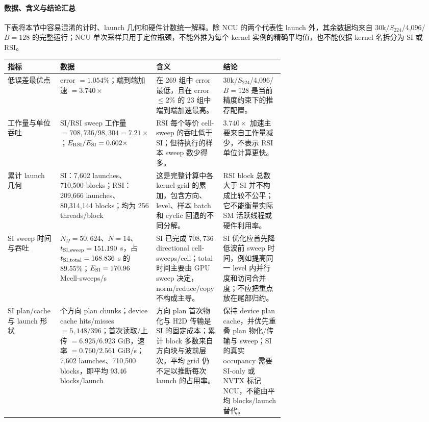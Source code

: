 \documentclass[10pt]{article}
\begin{document}
\paragraph{数据、含义与结论汇总}

下表将本节中容易混淆的计时、launch 几何和硬件计数统一解释。除 NCU 的两个代表性 launch 外，其余数据均来自 30k/$S_{224}$/4,096/$B=128$ 的完整运行；NCU 单次采样只用于定位瓶颈，不能外推为每个 kernel 实例的精确平均值，也不能仅据 kernel 名拆分为 SI 或 RSI。

{\scriptsize\renewcommand{\arraystretch}{1.10}\setlength{\tabcolsep}{3pt}
\begin{tabularx}{\linewidth}{>{\raggedright\arraybackslash}p{0.19\linewidth}>{\raggedright\arraybackslash}p{0.22\linewidth}>{\raggedright\arraybackslash}X>{\raggedright\arraybackslash}p{0.22\linewidth}}
\toprule
指标 & 数据 & 含义 & 结论\\
\midrule
低误差最优点 & error $=1.054\%$；端到端加速 $=3.740\times$ & 在 269 组中 error 最低，且在 error $\leq2\%$ 的 23 组中端到端加速最高。 & 30k/$S_{224}$/4,096/$B=128$ 是当前精度约束下的推荐配置。\\
工作量与单位吞吐 & SI/RSI sweep 工作量 $=708,736/98,304=7.21\times$；$E_{\rm RSI}/E_{\rm SI}=0.602\times$ & RSI 每个等价 cell-sweep 的吞吐低于 SI；但待执行的样本 sweep 数少得多。 & $3.740\times$ 加速主要来自工作量减少，不表示 RSI 单位计算更快。\\
累计 launch 几何 & SI：7,602 launches、710,500 blocks；RSI：209,666 launches、80,314,144 blocks；均为 256 threads/block & 这是完整计算中各 kernel grid 的累加，包含方向、level、样本 batch 和 cyclic 回退的不同分解。 & RSI block 总数大于 SI 并不构成比较不公平；它不能衡量实际 SM 活跃线程或硬件利用率。\\
SI sweep 时间与吞吐 & $N_\Omega=50,624$、$N=14$、$t_{\rm SI,sweep}=151.190$ s，占 $t_{\rm SI,total}=168.836$ s 的 $89.55\%$；$E_{\rm SI}=170.96$ Mcell-sweeps/s & SI 已完成 $708,736$ directional cell-sweeps/cell；total 时间主要由 GPU sweep 决定，norm/reduce/copy 不构成主导。 & SI 优化应首先降低波前 sweep 时间，例如提高同一 level 内并行度和访问合并度；不应把重点放在尾部归约。\\
SI plan/cache 与 launch 形状 & 396 个方向 plan chunks；device cache hits/misses $=5,148/396$；首次读取/上传 $=6.925/6.923$ GiB，速率 $=0.760/2.561$ GiB/s；7,602 launches、710,500 blocks，即平均 93.46 blocks/launch & 方向 plan 首次物化与 H2D 传输是 SI 的固定成本；累计 block 多数来自方向块与波前层次，平均 grid 仍不足以推断每次 launch 的占用率。 & 保持 device plan cache，并优先重叠 plan 物化/传输与 sweep；SI 的真实 occupancy 需要 SI-only 或 NVTX 标记 NCU，不能由平均 blocks/launch 替代。\\

\end{tabularx}}
\end{document}
